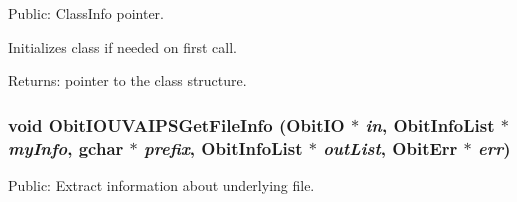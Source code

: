 Public: Class\-Info pointer. 

Initializes class if needed on first call. \begin{Desc}
\item[Returns:]pointer to the class structure. \end{Desc}
\subsubsection{\setlength{\rightskip}{0pt plus 5cm}void Obit\-IOUVAIPSGet\-File\-Info ({\bf Obit\-IO} $\ast$ {\em in}, {\bf Obit\-Info\-List} $\ast$ {\em my\-Info}, gchar $\ast$ {\em prefix}, {\bf Obit\-Info\-List} $\ast$ {\em out\-List}, {\bf Obit\-Err} $\ast$ {\em err})}\label{ObitIOUVAIPS_8h_a26}


Public: Extract information about underlying file. 

